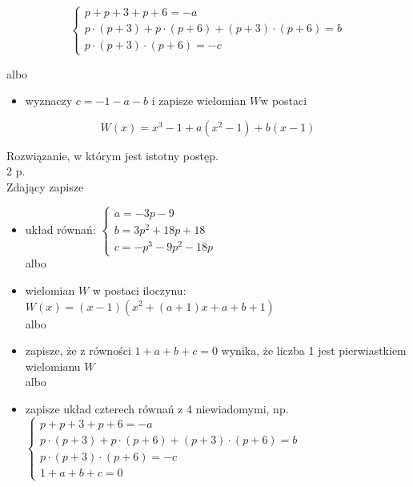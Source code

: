 \documentclass[10pt]{article}
\begin{document}
$$
\left\{\begin{array}{l}
p+p+3+p+6=-a \\
p \cdot(p+3)+p \cdot(p+6)+(p+3) \cdot(p+6)=b \\
p \cdot(p+3) \cdot(p+6)=-c
\end{array}\right.
$$

albo

\begin{itemize}
  \item wyznaczy $c=-1-a-b$ i zapisze wielomian $W \mathrm{w}$ postaci
\end{itemize}

$$
W(x)=x^{3}-1+a\left(x^{2}-1\right)+b(x-1)
$$

Rozwiązanie, w którym jest istotny postęp.\\
2 p.\\
Zdający zapisze

\begin{itemize}
  \item układ równań: $\left\{\begin{array}{l}a=-3 p-9 \\ b=3 p^{2}+18 p+18 \\ c=-p^{3}-9 p^{2}-18 p\end{array}\right.$\\
albo
  \item wielomian $W$ w postaci iloczynu: $W(x)=(x-1)\left(x^{2}+(a+1) x+a+b+1\right)$\\
albo
  \item zapisze, że z równości $1+a+b+c=0$ wynika, że liczba 1 jest pierwiastkiem wielomianu $W$\\
albo
  \item zapisze układ czterech równań z 4 niewiadomymi, np.\\
$\left\{\begin{array}{l}p+p+3+p+6=-a \\ p \cdot(p+3)+p \cdot(p+6)+(p+3) \cdot(p+6)=b \\ p \cdot(p+3) \cdot(p+6)=-c \\ 1+a+b+c=0\end{array}\right.$
\end{itemize}
\end{document}
